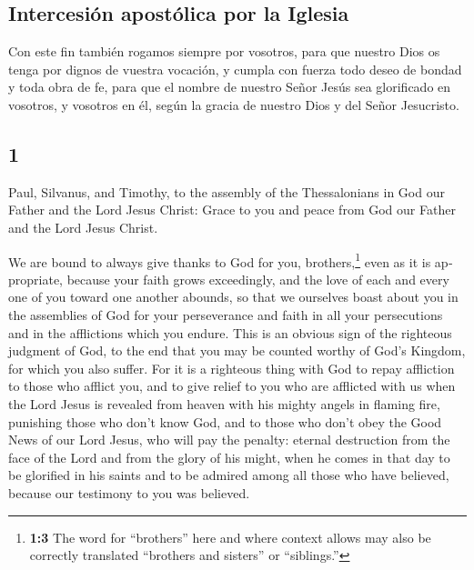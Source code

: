 \begin{paracol}{2}
\hypertarget{intercesiuxf3n-apostuxf3lica-por-la-iglesia}{%
\subsection{Intercesión apostólica por la
Iglesia}\label{intercesiuxf3n-apostuxf3lica-por-la-iglesia}}

 Con este fin también rogamos siempre por vosotros, para
que nuestro Dios os tenga por dignos de vuestra vocación, y cumpla con
fuerza todo deseo de bondad y toda obra de fe,  para que
el nombre de nuestro Señor Jesús sea glorificado en vosotros, y vosotros
en él, según la gracia de nuestro Dios y del Señor Jesucristo.

\switchcolumn
\begin{otherlanguage}{english}

\hypertarget{section-1}{%
\section{1}\label{section-1}}

 Paul, Silvanus, and Timothy, to the assembly of the
Thessalonians in God our Father and the Lord Jesus Christ:
 Grace to you and peace from God our Father and the Lord
Jesus Christ.

 We are bound to always give thanks to God for you,
brothers,\footnote{\textbf{1:3} The word for ``brothers'' here and where
  context allows may also be correctly translated ``brothers and
  sisters'' or ``siblings.''} even as it is appropriate, because your
faith grows exceedingly, and the love of each and every one of you
toward one another abounds,  so that we ourselves boast
about you in the assemblies of God for your perseverance and faith in
all your persecutions and in the afflictions which you endure.
 This is an obvious sign of the righteous judgment of God,
to the end that you may be counted worthy of God's Kingdom, for which
you also suffer.  For it is a righteous thing with God to
repay affliction to those who afflict you,  and to give
relief to you who are afflicted with us when the Lord Jesus is revealed
from heaven with his mighty angels in flaming fire, 
punishing those who don't know God, and to those who don't obey the Good
News of our Lord Jesus,  who will pay the penalty: eternal
destruction from the face of the Lord and from the glory of his might,
 when he comes in that day to be glorified in his saints
and to be admired among all those who have believed, because our
testimony to you was believed.


\end{otherlanguage}
\end{paracol}

